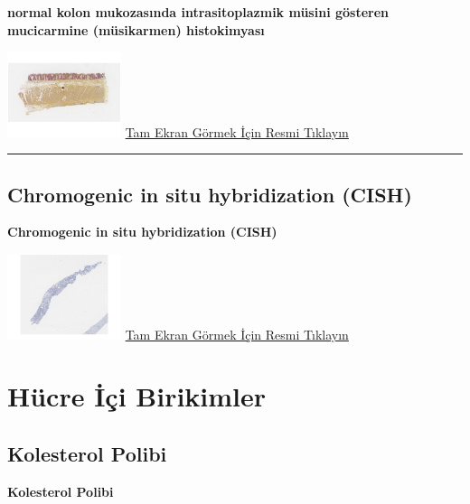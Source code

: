 \documentclass[
  letterpaper,
  DIV=11,
  numbers=noendperiod]{scrreprt}
\begin{document}
\textbf{normal kolon mukozasında intrasitoplazmik müsini gösteren
mucicarmine (müsikarmen) histokimyası}

\href{https://images.patolojiatlasi.com/mucin/mucicarmine.html}{\includegraphics[width=0.25\textwidth,height=\textheight]{./screenshots/mucicarmine_screenshot.png}}
\href{https://images.patolojiatlasi.com/mucin/mucicarmine.html}{Tam
Ekran Görmek İçin Resmi Tıklayın}

\begin{center}\rule{0.5\linewidth}{0.5pt}\end{center}

\hypertarget{sec-chromogenic-in-situ-hybridization-cish}{%
\section{Chromogenic in situ hybridization
(CISH)}\label{sec-chromogenic-in-situ-hybridization-cish}}

\textbf{Chromogenic in situ hybridization (CISH)}

\href{https://images.patolojiatlasi.com/her2-cish/cish.html}{\includegraphics[width=0.25\textwidth,height=\textheight]{./screenshots/cish_screenshot.png}}
\href{https://images.patolojiatlasi.com/her2-cish/cish.html}{Tam Ekran
Görmek İçin Resmi Tıklayın}

\hypertarget{sec-hucre-ici-birikimler}{%
\chapter{Hücre İçi Birikimler}\label{sec-hucre-ici-birikimler}}

\hypertarget{sec-kolesterol-polibi}{%
\section{Kolesterol Polibi}\label{sec-kolesterol-polibi}}

\textbf{Kolesterol Polibi}
\end{document}
